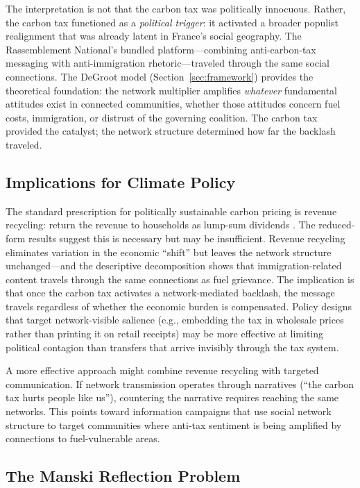 \documentclass[12pt]{article}
\newcommand{\rn}{Rassemblement National}
\begin{document}
The interpretation is not that the carbon tax was politically innocuous. Rather, the carbon tax functioned as a \emph{political trigger}: it activated a broader populist realignment that was already latent in France's social geography. The \rn{}'s bundled platform---combining anti-carbon-tax messaging with anti-immigration rhetoric---traveled through the same social connections. The DeGroot model (Section~\ref{sec:framework}) provides the theoretical foundation: the network multiplier amplifies \emph{whatever} fundamental attitudes exist in connected communities, whether those attitudes concern fuel costs, immigration, or distrust of the governing coalition. The carbon tax provided the catalyst; the network structure determined how far the backlash traveled.

\subsection{Implications for Climate Policy}

The standard prescription for politically sustainable carbon pricing is revenue recycling: return the revenue to households as lump-sum dividends \citep{klenert2018carbon, stiglitz2019addressing}. The reduced-form results suggest this is necessary but may be insufficient. Revenue recycling eliminates variation in the economic ``shift'' but leaves the network structure unchanged---and the descriptive decomposition shows that immigration-related content travels through the same connections as fuel grievance. The implication is that once the carbon tax activates a network-mediated backlash, the message travels regardless of whether the economic burden is compensated. Policy designs that target network-visible salience (e.g., embedding the tax in wholesale prices rather than printing it on retail receipts) may be more effective at limiting political contagion than transfers that arrive invisibly through the tax system.

A more effective approach might combine revenue recycling with targeted communication. If network transmission operates through narratives (``the carbon tax hurts people like us''), countering the narrative requires reaching the same networks. This points toward information campaigns that use social network structure to target communities where anti-tax sentiment is being amplified by connections to fuel-vulnerable areas.

\subsection{The Manski Reflection Problem}
\end{document}
